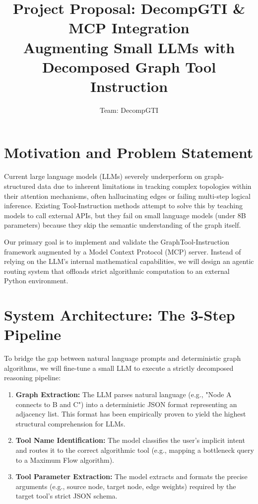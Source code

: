 \documentclass[11pt,a4paper]{article}
\title{\textbf{Project Proposal: DecompGTI \& MCP Integration \\ \large Augmenting Small LLMs with Decomposed Graph Tool Instruction}}
\author{Team: DecompGTI}
\date{}
\begin{document}
\maketitle

\section{Motivation and Problem Statement}
Current large language models (LLMs) severely underperform on graph-structured data due to inherent limitations in tracking complex topologies within their attention mechanisms, often hallucinating edges or failing multi-step logical inference. Existing Tool-Instruction methods attempt to solve this by teaching models to call external APIs, but they fail on small language models (under 8B parameters) because they skip the semantic understanding of the graph itself. 

Our primary goal is to implement and validate the GraphTool-Instruction framework augmented by a Model Context Protocol (MCP) server. Instead of relying on the LLM's internal mathematical capabilities, we will design an agentic routing system that offloads strict algorithmic computation to an external Python environment. 

\section{System Architecture: The 3-Step Pipeline}
To bridge the gap between natural language prompts and deterministic graph algorithms, we will fine-tune a small LLM to execute a strictly decomposed reasoning pipeline:
\begin{enumerate}
    \item \textbf{Graph Extraction:} The LLM parses natural language (e.g., "Node A connects to B and C") into a deterministic JSON format representing an adjacency list. This format has been empirically proven to yield the highest structural comprehension for LLMs.
    \item \textbf{Tool Name Identification:} The model classifies the user's implicit intent and routes it to the correct algorithmic tool (e.g., mapping a bottleneck query to a Maximum Flow algorithm).
    \item \textbf{Tool Parameter Extraction:} The model extracts and formats the precise arguments (e.g., source node, target node, edge weights) required by the target tool's strict JSON schema.
\end{enumerate}
\end{document}
